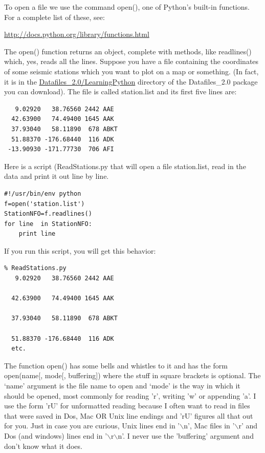 \documentclass[11pt]{book}
\begin{document}
{{{To open a file we use the command {\color{blue}open()}, one of Python's built-in functions.  For a complete list of these, see:

\url{http://docs.python.org/library/functions.html}

\noindent  The  {\color{blue}open()} function returns an object,  complete with methods, like {\color{blue}readlines()} which, yes, reads all the lines.   Suppose you have a file containing the coordinates of some
seismic stations which you want to plot on a map or something. (In fact, it is in the \href{#Datafiles}{Datafiles\_2.0/LearningPython} directory of the Datafiles\_2.0 package you can download).   The file
is called {\color{blue}   station.list} and its first five lines are:

{\color{blue}\begin{verbatim}
   9.02920   38.76560 2442 AAE 
  42.63900   74.49400 1645 AAK 
  37.93040   58.11890  678 ABKT
  51.88370 -176.68440  116 ADK 
 -13.90930 -171.77730  706 AFI
 \end{verbatim}}
Here is a script ({\color{blue}ReadStations.py} that will open a file  {\color{blue}station.list}, read in the data and print it out line by line.  
{ \color{blue} \begin{verbatim}
#!/usr/bin/env python
f=open('station.list')
StationNFO=f.readlines()
for line  in StationNFO:
    print line
\end{verbatim}}

If you run this script, you will get this behavior:
{ \color{blue} \begin{verbatim}
% ReadStations.py
   9.02920   38.76560 2442 AAE 

  42.63900   74.49400 1645 AAK 

  37.93040   58.11890  678 ABKT

  51.88370 -176.68440  116 ADK 
  etc.
  \end{verbatim}}

\noindent The function  {\color{blue}open()} has some bells and whistles to it and has the form  {\color{blue}open(name[, mode[, buffering])} where the stuff in square brackets is optional.  The `name' argument is the file name to open and `mode' is the way in which it should be opened, most commonly for reading 'r', writing 'w' or appending 'a'.  I use the form 'rU' for unformatted reading because I often want to read in files that were saved in Dos, Mac OR Unix line endings and 'rU' figures all that out for you.  Just in case you are curious, Unix lines end in '$\backslash$n',  Mac files in '$\backslash$r' and Dos (and windows) lines end in '$\backslash$r$\backslash$n'.     I never use the 'buffering' argument and don't know what it does.  

}}}
\end{document}
